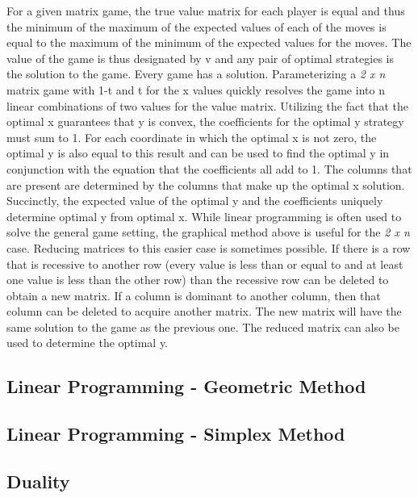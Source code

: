 \documentclass[12pt]{article}
\begin{document}
\newline
For a given matrix game, the true value matrix for each player is equal and thus the minimum of the maximum of the expected values of each of the moves is equal to the maximum of the minimum 
of the expected values for the moves. The value of the game is thus designated by v and any pair of optimal strategies is the solution to the game. Every game has a solution. Parameterizing 
a \textit{2 x n} matrix game with 1-t and t for the x values quickly resolves the game into n linear combinations of two values for the value matrix. Utilizing the fact that the optimal 
x guarantees that y is convex, the coefficients for the optimal y strategy must sum to 1. For each coordinate in which the optimal x is not zero, the optimal y is also equal to this result 
and can be used to find the optimal y in conjunction with the equation that the coefficients all add to 1. The columns that are present are determined by the columns that make up the optimal 
x solution. Succinctly, the expected value of the optimal y and the coefficients uniquely determine optimal y from optimal x. 
\newline
\newline
While linear programming is often used to solve the general game setting, the graphical method above is useful for the \textit{2 x n} case. Reducing matrices to this easier case is sometimes 
possible. If there is a row that is recessive to another row (every value is less than or equal to and at least one value is less than the other row) than the recessive row can be deleted to 
obtain a new matrix. If a column is dominant to another column, then that column can be deleted to acquire another matrix. The new matrix will have the same solution to the game as the previous 
one. The reduced matrix can also be used to determine the optimal y. 
\subsection{Linear Programming - Geometric Method}
\subsection{Linear Programming - Simplex Method}
\subsection{Duality}
\end{document}

